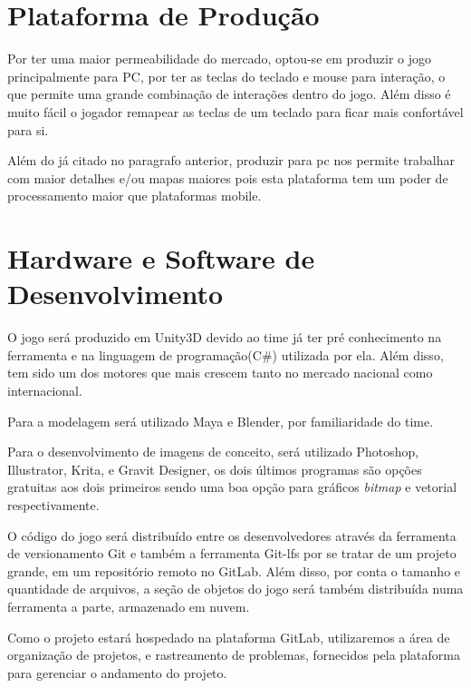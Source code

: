 
\section{Plataforma de Produção}

Por ter uma maior permeabilidade do mercado, optou-se em produzir o jogo principalmente para PC, por ter as teclas do teclado e mouse para interação, o que permite uma grande combinação de interações dentro do jogo. Além disso é muito fácil o jogador remapear as teclas de um teclado para ficar mais confortável para si.

Além do já citado no paragrafo anterior, produzir para pc nos permite trabalhar com maior detalhes e/ou mapas maiores pois esta plataforma tem um poder de processamento maior que plataformas mobile.



\section{Hardware e Software de Desenvolvimento}

O jogo será produzido em Unity3D devido ao time já ter pré conhecimento na ferramenta e na linguagem de programação(C\#) utilizada por ela. Além disso, tem sido um dos motores que mais crescem tanto no mercado nacional como internacional.

Para a modelagem será utilizado Maya e Blender, por familiaridade do time.

Para o desenvolvimento de imagens de conceito, será utilizado Photoshop, Illustrator, Krita, e Gravit Designer, os dois últimos programas são opções gratuitas aos dois primeiros sendo uma boa opção para gráficos \textit{bitmap} e  vetorial respectivamente.

O código do jogo será distribuído entre os desenvolvedores através da ferramenta de versionamento Git e também a ferramenta Git-lfs por se tratar de um projeto grande, em um repositório remoto no GitLab. Além disso, por conta o tamanho e quantidade de arquivos, a seção de objetos do jogo será também distribuída numa ferramenta a parte, armazenado em nuvem.

Como o projeto estará hospedado na plataforma GitLab, utilizaremos a área de organização de projetos, e rastreamento de problemas, fornecidos pela plataforma para gerenciar o andamento do projeto.


